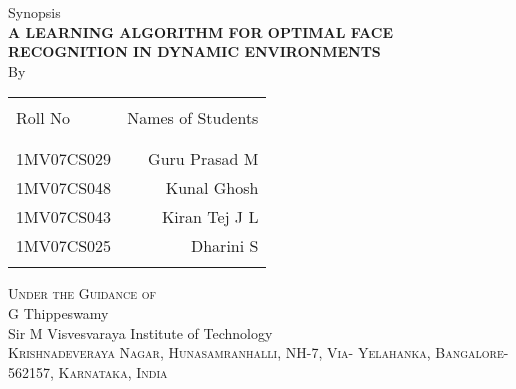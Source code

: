 \begin{titlepage}

\begin{center}

\textup{\large Synopsis}\\[1.0cm]

\uppercase{\Large \textbf {A Learning Algorithm for Optimal Face Recognition in Dynamic Environments}}\\[3.0cm]

\normalsize By \\
\begin{table}[h]
\centering
\begin{tabular}{lr}\hline \\
Roll No & Names of Students \\ \\ \hline
\\
1MV07CS029 & Guru Prasad M \\
1MV07CS048 & Kunal Ghosh \\
1MV07CS043 & Kiran Tej J L \\
1MV07CS025 & Dharini S \\ \\ \hline 
\end{tabular}
\end{table}

\vfill

\normalsize
\textsc{Under the Guidance of }\\
G Thippeswamy\\
\LARGE{Sir M Visvesvaraya Institute of Technology }\\
\normalsize
\textsc{Krishnadeveraya Nagar, Hunasamranhalli, NH-7, Via- Yelahanka, Bangalore-562157, Karnataka, India}\\

\vspace{0.5cm}


\end{center}

\end{titlepage}
